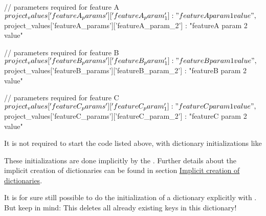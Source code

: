 \vspace{2ex}

\textbullet {}

\begin{pythoncode}
{
   // parameters required for feature A
   ${project_values}['featureA_params']['featureA_param_1'] : "featureA param 1 value",
   ${project_values}['featureA_params']['featureA_param_2'] : "featureA param 2 value"
}
\end{pythoncode}

\vspace{2ex}

\textbullet {}

\begin{pythoncode}
{
   // parameters required for feature B
   ${project_values}['featureB_params']['featureB_param_1'] : "featureB param 1 value",
   ${project_values}['featureB_params']['featureB_param_2'] : "featureB param 2 value"
}
\end{pythoncode}

\vspace{2ex}

\textbullet {}

\begin{pythoncode}
{
   // parameters required for feature C
   ${project_values}['featureC_params']['featureC_param_1'] : "featureC param 1 value",
   ${project_values}['featureC_params']['featureC_param_2'] : "featureC param 2 value"
}
\end{pythoncode}

\vspace{2ex}

It is not required to start the code listed above, with dictionary initializations like


These initializations are done implicitly by the \pkg. Further details about the implicit creation of dictionaries can be found in section
\hyperref[implicit-creation]{Implicit creation of dictionaries}.

It is for sure still possible to do the initialization of a dictionary explicitly with \pcode{\{\}}. But keep in mind: This deletes all already existing keys in this dictionary!

